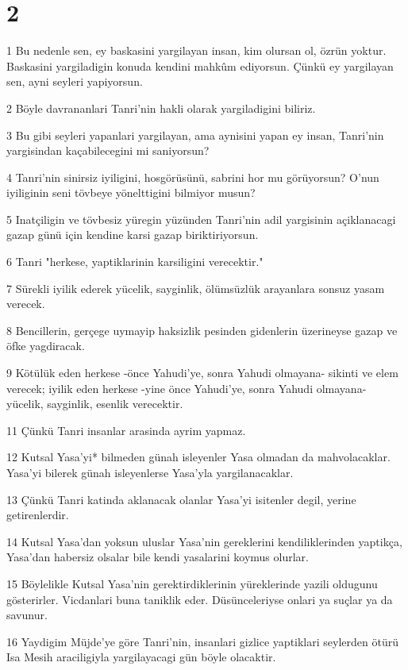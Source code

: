\chapter{2}

\par 1 Bu nedenle sen, ey baskasini yargilayan insan, kim olursan ol, özrün yoktur. Baskasini yargiladigin konuda kendini mahkûm ediyorsun. Çünkü ey yargilayan sen, ayni seyleri yapiyorsun.
\par 2 Böyle davrananlari Tanri'nin hakli olarak yargiladigini biliriz.
\par 3 Bu gibi seyleri yapanlari yargilayan, ama aynisini yapan ey insan, Tanri'nin yargisindan kaçabilecegini mi saniyorsun?
\par 4 Tanri'nin sinirsiz iyiligini, hosgörüsünü, sabrini hor mu görüyorsun? O'nun iyiliginin seni tövbeye yönelttigini bilmiyor musun?
\par 5 Inatçiligin ve tövbesiz yüregin yüzünden Tanri'nin adil yargisinin açiklanacagi gazap günü için kendine karsi gazap biriktiriyorsun.
\par 6 Tanri "herkese, yaptiklarinin karsiligini verecektir."
\par 7 Sürekli iyilik ederek yücelik, sayginlik, ölümsüzlük arayanlara sonsuz yasam verecek.
\par 8 Bencillerin, gerçege uymayip haksizlik pesinden gidenlerin üzerineyse gazap ve öfke yagdiracak.
\par 9 Kötülük eden herkese -önce Yahudi'ye, sonra Yahudi olmayana- sikinti ve elem verecek; iyilik eden herkese -yine önce Yahudi'ye, sonra Yahudi olmayana- yücelik, sayginlik, esenlik verecektir.
\par 11 Çünkü Tanri insanlar arasinda ayrim yapmaz.
\par 12 Kutsal Yasa'yi* bilmeden günah isleyenler Yasa olmadan da mahvolacaklar. Yasa'yi bilerek günah isleyenlerse Yasa'yla yargilanacaklar.
\par 13 Çünkü Tanri katinda aklanacak olanlar Yasa'yi isitenler degil, yerine getirenlerdir.
\par 14 Kutsal Yasa'dan yoksun uluslar Yasa'nin gereklerini kendiliklerinden yaptikça, Yasa'dan habersiz olsalar bile kendi yasalarini koymus olurlar.
\par 15 Böylelikle Kutsal Yasa'nin gerektirdiklerinin yüreklerinde yazili oldugunu gösterirler. Vicdanlari buna taniklik eder. Düsünceleriyse onlari ya suçlar ya da savunur.
\par 16 Yaydigim Müjde'ye göre Tanri'nin, insanlari gizlice yaptiklari seylerden ötürü Isa Mesih araciligiyla yargilayacagi gün böyle olacaktir.
